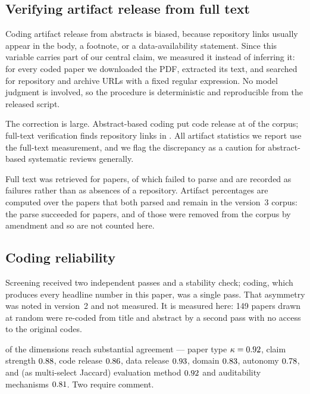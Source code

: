 \subsection{Verifying artifact release from full text}
\label{sec:artifacts}

Coding artifact release from abstracts is biased, because repository links usually appear in
the body, a footnote, or a data-availability statement. Since this variable carries part of
our central claim, we measured it instead of inferring it: for every coded paper we downloaded
the PDF, extracted its text, and searched for repository and archive URLs with a fixed regular
expression. No model judgment is involved, so the procedure is deterministic and reproducible
from the released script.

The correction is large. Abstract-based coding put code release at \pctRepoAbstract{} of the
corpus; full-text verification finds repository links in \pctRepo{}. All artifact statistics
we report use the full-text measurement, and we flag the discrepancy as a caution for
abstract-based systematic reviews generally.

Full text was retrieved for \nArtAttempted{} papers, of which \nArtFailed{} failed to parse
and are recorded as failures rather than as absences of a repository. Artifact percentages are
computed over the \nArtChecked{} papers that both parsed and remain in the version~3 corpus:
the parse succeeded for \nArtParsed{} papers, and \nArtDropped{} of those were removed from
the corpus by amendment and so are not counted here.

\subsection{Coding reliability}
\label{sec:codingrel}

Screening received two independent passes and a stability check; coding, which produces every
headline number in this paper, was a single pass. That asymmetry was noted in version~2 and
not measured. It is measured here: 149 papers drawn at random were re-coded from title and
abstract by a second pass with no access to the original codes.

\nRelSubstantial{} of the \nRelDims{} dimensions reach substantial agreement --- paper type
$\kappa=0.92$, claim strength $0.88$, code release $0.86$, data
release $0.93$, domain $0.83$, autonomy $0.78$, and (as multi-select
Jaccard) evaluation method $0.92$ and auditability mechanisms $0.81$. Two require
comment.

